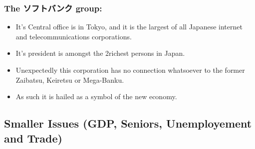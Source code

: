 \documentclass{article}
\begin{document}
\subsubsection{ The ソフトバンク group: }
\begin{itemize}
\item It's Central office is in Tokyo, and it is the largest of all Japanese internet and telecommunications corporations. 
\item It's president is amongst the 2richest persons in Japan.
\item Unexpectedly this corporation has no connection whatsoever to the former Zaibatsu, Keiretsu or Mega-Banku.
\item As such it is hailed as a symbol of the new economy. 
\end{itemize}
\subsection{ Smaller Issues (GDP, Seniors, Unemployement and Trade)}
\end{document}
